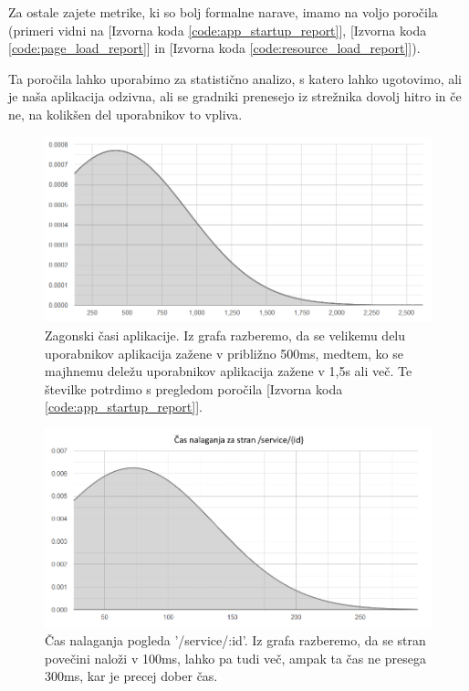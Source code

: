 \documentclass[a4paper, 12pt]{book}
\begin{document}
Za ostale zajete metrike, ki so bolj formalne narave, imamo na voljo poročila (primeri vidni na  [Izvorna koda \ref{code:app_startup_report}],  [Izvorna koda \ref{code:page_load_report}] in  [Izvorna koda \ref{code:resource_load_report}]).

Ta poročila lahko uporabimo za statistično analizo, s katero lahko ugotovimo, ali je naša aplikacija odzivna, ali se gradniki prenesejo iz strežnika dovolj hitro in če ne, na kolikšen del uporabnikov to vpliva.

\begin{figure}[h]
	\begin{center}
		\includegraphics[width=1\textwidth]{app_startup_graph.png}
	\end{center}
	\caption{Zagonski časi aplikacije. Iz grafa razberemo, da se velikemu delu uporabnikov aplikacija zažene v približno 500ms, medtem, ko se majhnemu deležu uporabnikov aplikacija zažene v 1,5s ali več. Te številke potrdimo s pregledom poročila [Izvorna koda \ref{code:app_startup_report}].}
	\label{img:graph_app_startup}
\end{figure}

\begin{figure}[h]
	\begin{center}
		\includegraphics[width=1\textwidth]{page_load_graph_service_details.png}
	\end{center}
	\caption{Čas nalaganja pogleda '/service/:id'. Iz grafa razberemo, da se stran povečini naloži v 100ms, lahko pa tudi več, ampak ta čas ne presega 300ms, kar je precej dober čas.}
	\label{img:graph_page_load}
\end{figure}
\end{document}
